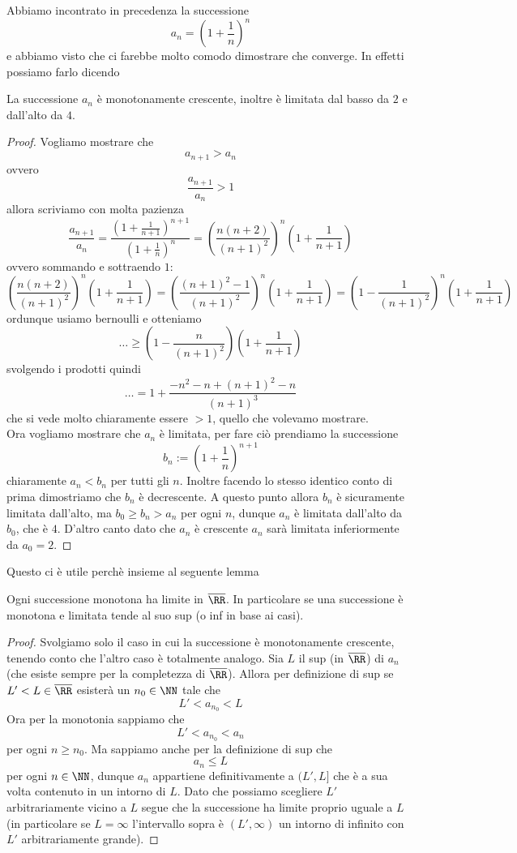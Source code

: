 \documentclass[11pt]{scrartcl}
\begin{document}
	Abbiamo incontrato in precedenza la successione
	$$a_n=\left(1+\frac{1}{n}\right)^n$$
	e abbiamo visto che ci farebbe molto comodo dimostrare che converge. In effetti possiamo farlo dicendo
	\begin{lemma}[Esistenza di $e$]
		La successione $a_n$ è monotonamente crescente, inoltre è limitata dal basso da $2$ e dall'alto da $4$.
	\end{lemma}
	\begin{proof}
		Vogliamo mostrare che 
		$$a_{n+1}>a_n$$
		ovvero
		$$\frac{a_{n+1}}{a_n}>1$$
		allora scriviamo con molta pazienza
		$$\frac{a_{n+1}}{a_n}=\frac{\left(1+\frac{1}{n+1}\right)^{n+1}}{\left(1+\frac{1}{n}\right)^n}=\left(\frac{n(n+2)}{(n+1)^2}\right)^n\left(1+\frac{1}{n+1}\right)$$
		ovvero sommando e sottraendo $1$:
		$$\left(\frac{n(n+2)}{(n+1)^2}\right)^n\left(1+\frac{1}{n+1}\right)=\left(\frac{(n+1)^2-1}{(n+1)^2}\right)^n\left(1+\frac{1}{n+1}\right)=\left(1-\frac{1}{(n+1)^2}\right)^n\left(1+\frac{1}{n+1}\right)$$
		ordunque usiamo bernoulli e otteniamo
		$$\dots \ge \left(1-\frac{n}{(n+1)^2}\right)\left(1+\frac{1}{n+1}\right)$$
		svolgendo i prodotti quindi
		$$\dots=1+\frac{-n^2-n+(n+1)^2-n}{(n+1)^3}$$
		che si vede molto chiaramente essere $>1$, quello che volevamo mostrare. \\
		Ora vogliamo mostrare che $a_n$ è limitata, per fare ciò prendiamo la successione
		$$b_n:=\left(1+\frac{1}{n}\right)^{n+1}$$
		chiaramente $a_n<b_n$ per tutti gli $n$. Inoltre facendo lo stesso identico conto di prima dimostriamo che $b_n$ è decrescente. A questo punto allora $b_n$ è sicuramente limitata dall'alto, ma $b_0\ge b_n>a_n$ per ogni $n$, dunque $a_n$ è limitata dall'alto da $b_0$, che è $4$. D'altro canto dato che $a_n$ è crescente $a_n$ sarà limitata inferiormente da $a_0=2$. 
	\end{proof}
	Questo ci è utile perchè insieme al seguente lemma
	\begin{lemma}
		Ogni successione monotona ha limite in $\overline{\RR}$. In particolare se una successione è monotona e limitata tende al suo sup (o inf in base ai casi).
	\end{lemma}
	\begin{proof}
		Svolgiamo solo il caso in cui la successione è monotonamente crescente, tenendo conto che l'altro caso è totalmente analogo. Sia $L$ il sup (in $\overline{\RR}$) di $a_n$ (che esiste sempre per la completezza di $\overline{\RR}$). Allora per definizione di sup se $L'<L\in\overline{\RR}$ esisterà un $n_0\in\NN$ tale che 
		$$L'<a_{n_0}<L$$ 
		Ora per la monotonia sappiamo che 
		$$L'<a_{n_0}<a_n$$
		per ogni $n\ge n_0$. Ma sappiamo anche per la definizione di sup che 
		$$a_n\le L$$
		per ogni $n\in\NN$, dunque $a_n$ appartiene definitivamente a $(L',L]$ che è a sua volta contenuto in un intorno di $L$. Dato che possiamo scegliere $L'$ arbitrariamente vicino a $L$ segue che la successione ha limite proprio uguale a $L$ (in particolare se $L=\infty$ l'intervallo sopra è $(L',\infty)$ un intorno di infinito con $L'$ arbitrariamente grande).
	\end{proof}
\end{document}
